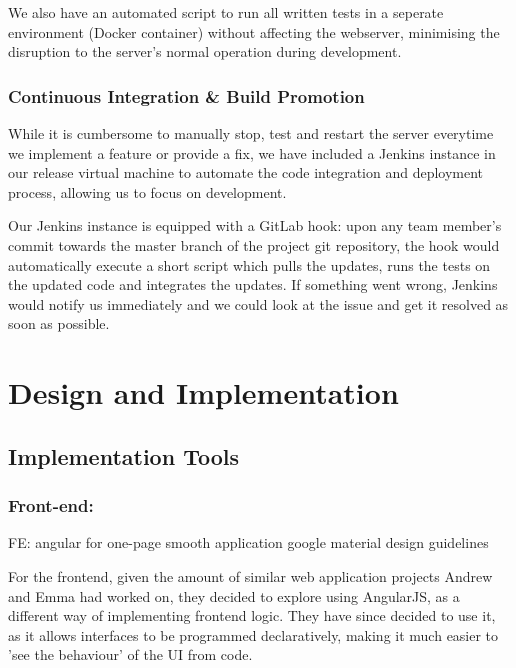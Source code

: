 \documentclass[a4paper, titlepage]{article}
\begin{document}
We also have an automated script to run all written tests in a seperate
environment (Docker container) without affecting the webserver, minimising
the disruption to the server's normal operation during development.



\subsubsection{Continuous Integration \& Build Promotion}

While it is cumbersome to manually stop, test and restart the server
everytime we implement a feature or provide a fix, we have
included a Jenkins instance in our release virtual machine to automate
the code integration and deployment process, allowing us to focus on
development.

Our Jenkins instance is equipped with a GitLab hook: upon any team member's
commit towards the master branch of the project git repository, the hook would
automatically execute a short script which pulls the updates, runs the tests
on the updated code and integrates the updates. If something went wrong,
Jenkins would notify us immediately and we could look at the issue and get
it resolved as soon as possible.


\newpage
\section{Design and Implementation}

\subsection{Implementation Tools}

\subsubsection{Front-end: }

FE: 
  angular for one-page smooth application
  google material design guidelines

For the frontend, given the amount of similar web application projects Andrew and Emma had worked on, they decided to explore using AngularJS, as a different way of implementing frontend logic. They have since decided to use it, as it allows interfaces to be programmed declaratively, making it much easier to 'see the behaviour' of the UI from code.
\end{document}
